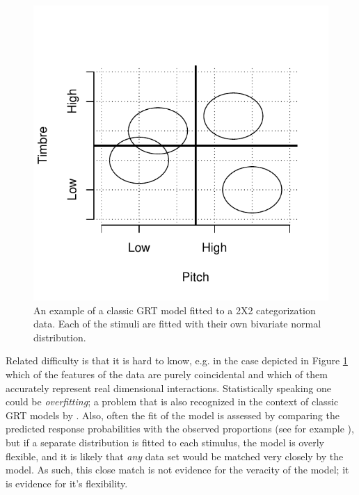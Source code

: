 \documentclass{article}\usepackage{knitr}
\begin{document}
\begin{figure}[!htb]
\centering
\begin{knitrout}
\color{fgcolor}
\includegraphics[width=\maxwidth]{figure/unnamed-chunk-12-1} 
\end{knitrout}
\caption{An example of a classic GRT model fitted to a 2X2 categorization data. Each of the stimuli are fitted with their own bivariate normal distribution.}
\label{fig:classicGRT}
\end{figure} 

Related difficulty is that it is hard to know, e.g. in the case depicted in Figure \ref{fig:classicGRT} which of the features of the data are purely coincidental and which of them accurately represent real dimensional interactions. Statistically speaking one could be \textit{overfitting}; a problem that is also recognized in the context of classic GRT models by \cite{soto2017}. Also, often the fit of the model is assessed by comparing the predicted response probabilities with the observed proportions (see for example \citet[Figure 4]{silbert2009}), but if a separate distribution is fitted to each stimulus, the model is overly flexible, and it is likely that \textit{any} data set would be matched very closely by the model. As such, this close match is not evidence for the veracity of the model; it is evidence for it's flexibility.
\end{document}
